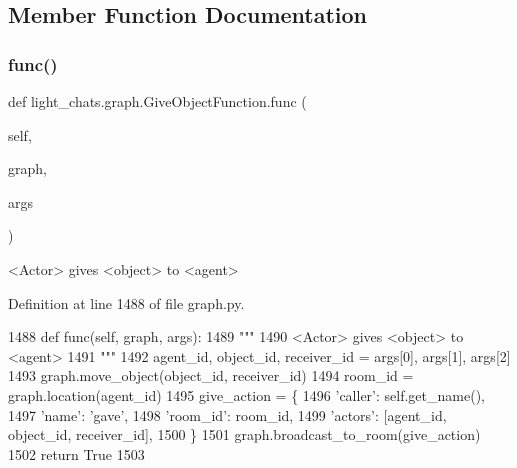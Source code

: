 \subsection{Member Function Documentation}
\mbox{\label{classlight__chats_1_1graph_1_1GiveObjectFunction_a8debb985c3252b31e92837bb6cb0d227}} 
\subsubsection{\texorpdfstring{func()}{func()}}
{\footnotesize\ttfamily def light\+\_\+chats.\+graph.\+Give\+Object\+Function.\+func (\begin{DoxyParamCaption}\item[{}]{self,  }\item[{}]{graph,  }\item[{}]{args }\end{DoxyParamCaption})}

\begin{DoxyVerb}<Actor> gives <object> to <agent>
\end{DoxyVerb}
 

Definition at line 1488 of file graph.\+py.


\begin{DoxyCode}
1488     \textcolor{keyword}{def }func(self, graph, args):
1489         \textcolor{stringliteral}{"""}
1490 \textcolor{stringliteral}{        <Actor> gives <object> to <agent>}
1491 \textcolor{stringliteral}{        """}
1492         agent\_id, object\_id, receiver\_id = args[0], args[1], args[2]
1493         graph.move\_object(object\_id, receiver\_id)
1494         room\_id = graph.location(agent\_id)
1495         give\_action = \{
1496             \textcolor{stringliteral}{'caller'}: self.get\_name(),
1497             \textcolor{stringliteral}{'name'}: \textcolor{stringliteral}{'gave'},
1498             \textcolor{stringliteral}{'room\_id'}: room\_id,
1499             \textcolor{stringliteral}{'actors'}: [agent\_id, object\_id, receiver\_id],
1500         \}
1501         graph.broadcast\_to\_room(give\_action)
1502         \textcolor{keywordflow}{return} \textcolor{keyword}{True}
1503 
\end{DoxyCode}
\mbox{\label{classlight__chats_1_1graph_1_1GiveObjectFunction_a53aa62498243387346fe8e3bae0434e2}} 
